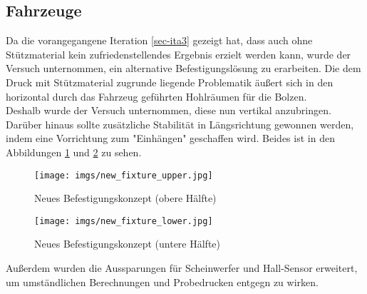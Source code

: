 \documentclass[.../Dokumentation.tex]{subfiles}
\begin{document}
\subsection{Fahrzeuge}\label{sec-ita4-cars}
Da die vorangegangene Iteration \ref{sec-ita3} gezeigt hat, dass auch ohne 
Stützmaterial kein zufriedenstellendes Ergebnis erzielt werden kann, 
wurde der Versuch unternommen, ein alternative Befestigungslösung zu erarbeiten. 
Die dem Druck mit Stützmaterial zugrunde liegende Problematik äußert sich in 
den horizontal durch das Fahrzeug geführten Hohlräumen für die Bolzen.\\
Deshalb wurde der Versuch unternommen, diese nun vertikal anzubringen.
Darüber hinaus sollte zusätzliche Stabilität in Längsrichtung gewonnen werden, 
indem eine Vorrichtung zum "Einhängen" geschaffen wird. 
Beides ist in den Abbildungen \ref{fig-new-fixture-upper} und 
\ref{fig-new-fixture-lower} zu sehen.
\begin{figure}[H]
\begin{center}
    \texttt{[image: imgs/new\_fixture\_upper.jpg]}
    \caption{Neues Befestigungskonzept (obere Hälfte)}
    \label{fig-new-fixture-upper}
\end{center}
\end{figure}
\noindent
\begin{figure}[H]
\begin{center}
    \texttt{[image: imgs/new\_fixture\_lower.jpg]}
    \caption{Neues Befestigungskonzept (untere Hälfte)}
    \label{fig-new-fixture-lower}
\end{center}
\end{figure}
\noindent 
Außerdem wurden die Aussparungen für Scheinwerfer und Hall-Sensor erweitert, 
um umständlichen Berechnungen und Probedrucken entgegn zu wirken.
\end{document}
